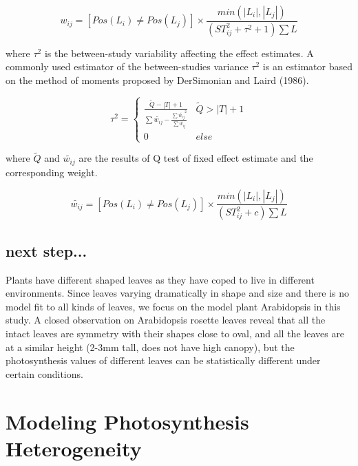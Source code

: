 \documentclass[times,11pt]{article}
\begin{document}
{\begin{equation}\label{eq:weight}
w_{ij}=[Pos(L_i)\neq  Pos(L_j)] \times \frac{min(|L_i|, |L_j|)}{(ST^2_{ij}+\tau^2+1) \sum L}
\end{equation}

\noindent where $\tau^2$ is the between-study variability affecting the effect estimates. A commonly used estimator of the between-studies variance $\tau^2$  is an estimator based on the method of moments proposed by DerSimonian and Laird (1986).

\begin{equation}\label{eq:tau}
\tau^2 = \left\{\begin{matrix}
 \frac{\widetilde{Q}-|T|+1}{\sum \widetilde{w_{ij}}-\frac{\sum \widetilde{w_{ij}}^2}{\sum \widetilde{w_{ij}}}} & \widetilde{Q}>|T|+1\\
 0 & else
\end{matrix}\right.
\end{equation}

\noindent where $\widetilde{Q}$ and $\widetilde{w_{ij}}$ are the results of Q test of fixed effect estimate and the corresponding weight.

\begin{equation}\label{eq:weight}
\widetilde{w_{ij}}=[Pos(L_i)\neq  Pos(L_j)] \times \frac{min(|L_i|, |L_j|)}{(ST^2_{ij}+c) \sum L}
\end{equation}

\subsection{next step...}

Plants have different shaped leaves as they have coped to live in different environments. Since leaves varying dramatically in shape and size and there is no model fit to all kinds of leaves, we focus on the model plant Arabidopsis in this study. A closed observation on Arabidopsis rosette leaves reveal that all the intact leaves are symmetry with their shapes close to oval, and all the leaves are at a similar height (2-3mm tall, does not have high canopy), but the photosynthesis values of different leaves can be statistically different under certain conditions.




\section{Modeling Photosynthesis Heterogeneity}


}
\end{document}
